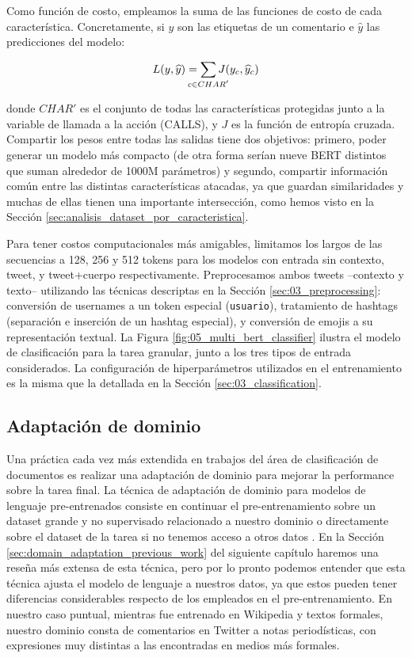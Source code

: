 Como función de costo, empleamos la suma de las funciones de costo de cada característica. Concretamente, si $y$ son las etiquetas de un comentario e $\widehat{y}$ las predicciones del modelo:

\begin{equation*}
    L(y, \widehat{y}) = \sum\limits_{\mathclap{c \in CHAR'}} J(y_c, \widehat{y}_c)
\end{equation*}

\noindent donde $CHAR'$ es el conjunto de todas las características protegidas junto a la variable de llamada a la acción (CALLS), y $ J$ es la función de entropía cruzada. Compartir los pesos entre todas las salidas tiene dos objetivos: primero, poder generar un modelo más compacto (de otra forma serían nueve BERT distintos que suman alrededor de \num{1000}M parámetros) y segundo, compartir información común entre las distintas características atacadas, ya que guardan similaridades y muchas de ellas tienen una importante intersección, como hemos visto en la Sección \ref{sec:analisis_dataset_por_caracteristica}.

Para tener costos computacionales más amigables, limitamos los largos de las secuencias a 128, 256 y 512 tokens para los modelos con entrada sin contexto, tweet, y tweet+cuerpo respectivamente. Preprocesamos ambos tweets --contexto y texto-- utilizando las técnicas descriptas en la Sección \ref{sec:03_preprocessing}: conversión de usernames a un token especial (\verb|usuario|), tratamiento de hashtags (separación e inserción de un hashtag especial), y conversión de emojis a su representación textual. La Figura \ref{fig:05_multi_bert_classifier} ilustra el modelo de clasificación para la tarea granular, junto a los tres tipos de entrada considerados. La configuración de hiperparámetros utilizados en el entrenamiento es la misma que la detallada en la Sección \ref{sec:03_classification}.

\subsection{Adaptación de dominio}

Una práctica cada vez más extendida en trabajos del área de clasificación de documentos es realizar una adaptación de dominio para mejorar la performance sobre la tarea final. La técnica de adaptación de dominio para modelos de lenguaje pre-entrenados consiste en continuar el pre-entrenamiento sobre un dataset grande y no supervisado relacionado a nuestro dominio o directamente sobre el dataset de la tarea si no tenemos acceso a otros datos \cite{gururangan-etal-2020-dont}. En la Sección \ref{sec:domain_adaptation_previous_work} del siguiente capítulo haremos una reseña más extensa de esta técnica, pero por lo pronto podemos entender que esta técnica ajusta el modelo de lenguaje a nuestros datos, ya que estos pueden tener diferencias considerables respecto de los empleados en el pre-entrenamiento. En nuestro caso puntual, mientras \beto{} fue entrenado en Wikipedia y textos formales, nuestro dominio consta de comentarios en Twitter a notas periodísticas, con expresiones muy distintas a las encontradas en medios más formales.

